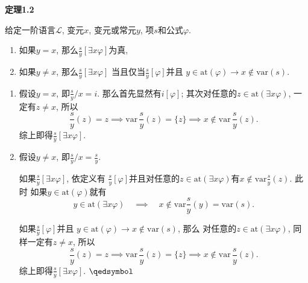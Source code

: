 \vspace{10pt}

\hypertarget{sec:定理1.2}{}
\noindent\textbf{定理1.2}

给定一阶语言$\mathcal{L}$, 变元$x$, 变元或常元$y$, 项$s$和公式$\varphi$.
\vspace{3pt}
\begin{enumerate}
    \item 如果$y=x$, 那么$\displaystyle\frac{s}{y}[\exists x\varphi]$为真,
    \vspace{6pt}
    \item 如果$y\neq x$, 那么$\displaystyle\frac{s}{y}[\exists x\varphi]$
    当且仅当$\displaystyle\frac{s}{y}[\varphi]$并且
    $y\in\mathrm{at}(\varphi)\to x\notin\mathrm{var}(s)$.
\end{enumerate}


\begin{enumerate}
    \item 假设$y=x$, 即$\displaystyle\frac{s}{y}/x=i$. 那么首先显然有$i[\varphi]$;
    其次对任意的$z\in\mathrm{at}(\exists x\varphi)$, 一定有$z\neq x$, 所以
    \[
        \frac{s}{y}(z)=z\implies\mathrm{var}\,\frac{s}{y}(z)=\{z\}
        \implies x\notin\mathrm{var}\,\frac{s}{y}(z).
    \]
    综上即得$\displaystyle\frac{s}{y}[\exists x\varphi]$.

    \vspace{3pt}
    \item 假设$y\neq x$, 即$\displaystyle\frac{s}{y}/x=\frac{s}{y}$.
    
    \vspace{6pt}\hspace{2.17em}
    如果$\displaystyle\frac{s}{y}[\exists x\varphi]$, 依定义有
    $\displaystyle\frac{s}{y}[\varphi]$并且对任意的$z\in\mathrm{at}
    (\exists x\varphi)$有$\displaystyle x\notin\mathrm{var}\frac{s}{y}(z)$. 此时
    如果$y\in\mathrm{at}(\varphi)$就有
    \[
        y\in\mathrm{at}(\exists x\varphi)\quad\implies\quad
        x\notin\mathrm{var}\frac{s}{y}(y)=\mathrm{var}(s).
    \]
    
    \hspace{2.17em}
    如果$\displaystyle\frac{s}{y}[\varphi]$并且
    $y\in\mathrm{at}(\varphi)\to x\notin\mathrm{var}(s)$, 那么
    对任意的$z\in\mathrm{at}(\exists x\varphi)$, 同样一定有$z\neq x$, 所以
    \[
        \frac{s}{y}(z)=z\implies\mathrm{var}\,\frac{s}{y}(z)=\{z\}
        \implies x\notin\mathrm{var}\,\frac{s}{y}(z).
    \]
    综上即得$\displaystyle\frac{s}{y}[\exists x\varphi]$. \hfill $\qedsymbol$
\end{enumerate}





